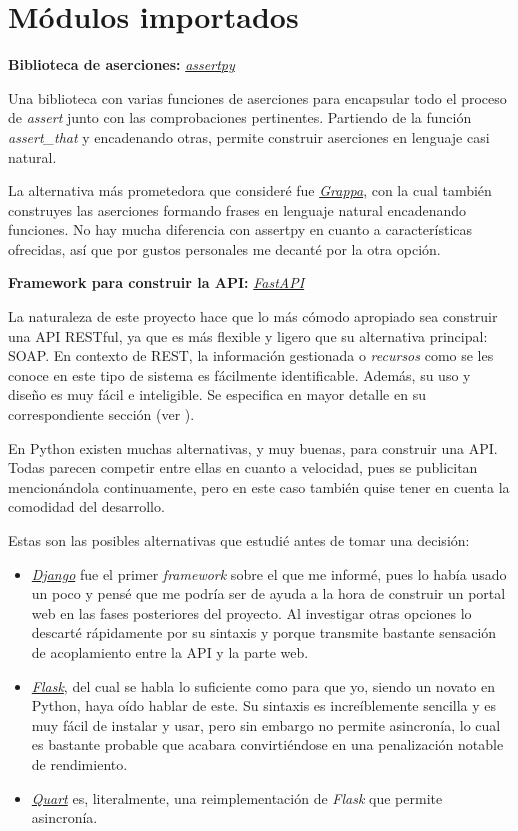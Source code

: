 \section{Módulos importados}

\textbf{Biblioteca de aserciones:} \href{https://github.com/assertpy/assertpy}{\textit{assertpy}}

Una biblioteca con varias funciones de aserciones para encapsular todo el proceso de \textit{assert} junto con las comprobaciones pertinentes. Partiendo de la función \textit{assert\_that} y encadenando otras, permite construir aserciones en lenguaje casi natural.

La alternativa más prometedora que consideré fue \href{https://github.com/grappa-py/grappa}{\textit{Grappa}}, con la cual también construyes las aserciones formando frases en lenguaje natural encadenando funciones. No hay mucha diferencia con assertpy en cuanto a características ofrecidas, así que por gustos personales me decanté por la otra opción.

\textbf{Framework para construir la API:} \href{https://fastapi.tiangolo.com/}{\textit{FastAPI}}

La naturaleza de este proyecto hace que lo más cómodo apropiado sea construir una API RESTful, ya que es más flexible y ligero que su alternativa principal: SOAP. En contexto de REST, la información gestionada o \textit{recursos} como se les conoce en este tipo de sistema es fácilmente identificable. Además, su uso y diseño es muy fácil e inteligible. Se especifica en mayor detalle en su correspondiente sección (ver \underline{}).

En Python existen muchas alternativas, y muy buenas, para construir una API. Todas parecen competir entre ellas en cuanto a velocidad, pues se publicitan mencionándola continuamente, pero en este caso también quise tener en cuenta la comodidad del desarrollo.

Estas son las posibles alternativas que estudié antes de tomar una decisión:
\begin{itemize}
    \item \href{https://www.djangoproject.com/}{\textit{Django}} fue el primer \textit{framework} sobre el que me informé, pues lo había usado un poco y pensé que me podría ser de ayuda a la hora de construir un portal web en las fases posteriores del proyecto. Al investigar otras opciones lo descarté rápidamente por su sintaxis y porque transmite bastante sensación de acoplamiento entre la API y la parte web.
    \item \href{https://flask.palletsprojects.com/en/2.2.x/}{\textit{Flask}}, del cual se habla lo suficiente como para que yo, siendo un novato en Python, haya oído hablar de este. Su sintaxis es increíblemente sencilla y es muy fácil de instalar y usar, pero sin embargo no permite asincronía, lo cual es bastante probable que acabara convirtiéndose en una penalización notable de rendimiento.
    \item \href{https://quart.palletsprojects.com/en/latest/}{\textit{Quart}} es, literalmente, una reimplementación de \textit{Flask} que permite asincronía.
\end{itemize}

